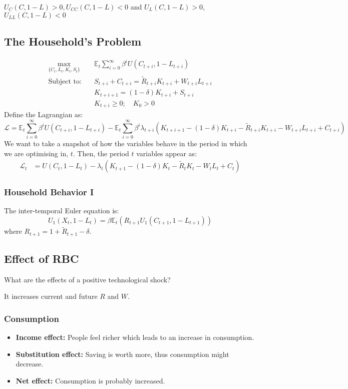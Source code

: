 $U_C (C, 1 - L) > 0, U_{C C} (C, 1 - L) < 0$ and $U_L (C, 1 - L) > 0$, $U_{L
L} (C, 1 - L) < 0$

\subsection{The Household's Problem}

\begin{align*}
  \max_{\{C_t, L_t, K_t, S_t\}} & \quad \mathbb{E}_t \sum_{i=0}^{\infty} \beta^i U(C_{t+i}, 1 - L_{t+i}) \\
  \text{Subject to:} & \quad S_{t+i} + C_{t+i} = \tilde{R}_{t+i} K_{t+i} + W_{t+i} L_{t+i} \\
  & \quad K_{t+i+1} = (1 - \delta) K_{t+i} + S_{t+i} \\
  & \quad K_{t+i} \geq 0; \quad K_0 > 0
\end{align*}
Define the Lagrangian as:
\[
\mathcal{L} = \mathbb{E}_t \sum_{i=0}^{\infty} \beta^i U(C_{t+i}, 1 - L_{t+i}) - \mathbb{E}_t \sum_{i=0}^{\infty} \beta^i \lambda_{t+i} (K_{t+i+1} - (1 - \delta) K_{t+i} - \tilde{R}_{t+i} K_{t+i} - W_{t+i} L_{t+i} + C_{t+i})
\]
We want to take a snapshot of how the variables behave in the period in which we are optimising
in, $t$. Then, the period $t$ variables appear as:
\begin{align*}
  \mathcal{L}_t &= U(C_{t}, 1 - L_{t}) - \lambda_{t} (K_{t+1} - (1 - \delta) K_{t} - \tilde{R}_{t} K_{t} - W_{t} L_{t} + C_{t})
\end{align*}

\subsubsection{Household Behavior I}

The inter-temporal Euler equation is:
\[U_1(X_t, 1-L_t) = \beta \mathbb{E}_t \left(R_{t+1} U_1(C_{t+1}, 1-L_{t+1} ) \right)\]
where $R_{t+1} = 1 + \tilde{R}_{t+1} - \delta $.

\subsection{Effect of RBC}

What are the effects of a positive technological shock?

It increases current and future $R$ and $W$.
\subsubsection{Consumption}
\begin{itemize}
  \item \textbf{Income effect:} People feel richer which leads to an increase in consumption.
  \item \textbf{Substitution effect:} Saving is worth more, thus consumption might decrease.
  \item \textbf{Net effect:} Consumption is probably increased.
\end{itemize}

